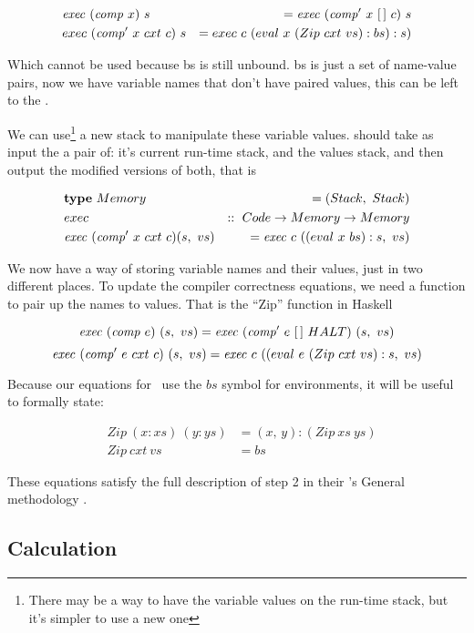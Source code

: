 \documentclass {article}
\begin{document}
\begin{eqnarray*}
&\mathit{exec\ } (\mathit{comp\ } x)\ s  
	&= \mathit{exec\ } (\mathit{comp'\ }  x\ [\,]\ c)\ s  \\
&exec\ (\mathit{comp'\ }  x\ cxt\ c)\ s  
	&= exec\ c\ (eval\ x\ (Zip\ cxt\ vs):bs):s)
\end{eqnarray*}

Which cannot be used
because bs is still unbound.
bs is just a set of name-value pairs,
now we have variable names
that don't have paired values,
this can be left to the \vm.

We can use\footnote{
There may be a way to have the variable values
on the run-time stack, but it's
simpler to use a new one}
a new stack to
manipulate these variable values.
\exec should take as input
the a pair of:
it's current run-time stack,
and the values stack,
and then output the modified versions of both,
that is

\begin{eqnarray*}
&\textbf{type}\ Memory\ &= (Stack,\ Stack) \\
&exec &::\ Code \rightarrow Memory \rightarrow Memory \\
&\Exec (\Compp  x\ cxt\ c) (s,\ vs) &= \Exec c\ ((eval\ x\ bs):s,\ vs)
\end{eqnarray*}

We now have a way of storing variable names
and their values, 
just in two different places.
To update the compiler correctness equations,
we need a function to pair up the names
to values.
That is the ``Zip'' function in Haskell

	\[ \mathit{exec\ } (\mathit{comp\ } e)\ (s,\ vs) 
		= \mathit{exec\ } (\mathit{comp'\ }  e\ [\,]\ HALT)\ (s,\ vs) \]
	\[ \mathit{exec\ } (\mathit{comp'\ }  e\ cxt\ c)\ (s,\ vs) 
		= \mathit{exec\ } c\ ((eval\ e\ (Zip\ cxt\ vs):s,\ vs) \]

Because our equations for \eval\
use the $bs$ symbol for environments,
it will be useful to formally state:

\begin{eqnarray}
&Zip\ (x:xs)\ (y:ys) &= (x,\, y):(Zip\ xs\ ys)  \\ \label{ziden}
&Zip\ cxt\ vs &= bs \label{zcxtvs}
\end{eqnarray}
	
These equations satisfy the full description
of step 2 in their \BH's General methodology
\cite[page 42]{bandh}.


\subsection{Calculation}
\end{document}
